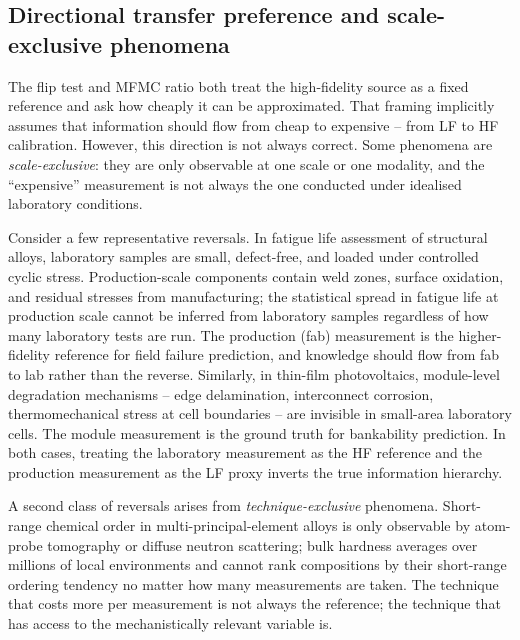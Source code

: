 \documentclass[twoside,twocolumn,9pt]{article}
\begin{document}
\subsection{Directional transfer preference and scale-exclusive phenomena}

The flip test and MFMC ratio both treat the high-fidelity source as a fixed reference and ask how cheaply it can be approximated. That framing implicitly assumes that information should flow from cheap to expensive -- from LF to HF calibration. However, this direction is not always correct. Some phenomena are \emph{scale-exclusive}: they are only observable at one scale or one modality, and the ``expensive'' measurement is not always the one conducted under idealised laboratory conditions.

Consider a few representative reversals. In fatigue life assessment of structural alloys, laboratory samples are small, defect-free, and loaded under controlled cyclic stress. Production-scale components contain weld zones, surface oxidation, and residual stresses from manufacturing; the statistical spread in fatigue life at production scale cannot be inferred from laboratory samples regardless of how many laboratory tests are run. The production (fab) measurement is the higher-fidelity reference for field failure prediction, and knowledge should flow from fab to lab rather than the reverse. Similarly, in thin-film photovoltaics, module-level degradation mechanisms -- edge delamination, interconnect corrosion, thermomechanical stress at cell boundaries -- are invisible in small-area laboratory cells. The module measurement is the ground truth for bankability prediction. In both cases, treating the laboratory measurement as the HF reference and the production measurement as the LF proxy inverts the true information hierarchy.

A second class of reversals arises from \emph{technique-exclusive} phenomena. Short-range chemical order in multi-principal-element alloys is only observable by atom-probe tomography or diffuse neutron scattering; bulk hardness averages over millions of local environments and cannot rank compositions by their short-range ordering tendency no matter how many measurements are taken. The technique that costs more per measurement is not always the reference; the technique that has access to the mechanistically relevant variable is.
\end{document}
